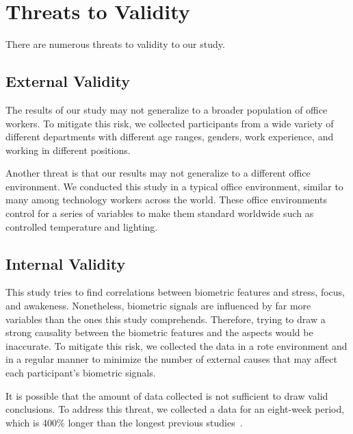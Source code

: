 \section{Threats to Validity}
There are numerous threats to validity to our study.

\subsection{External Validity}
The results of our study may 
 not generalize to a broader population of office workers.
To mitigate this risk, we collected participants
from a wide variety of different departments
with different age ranges, genders, work experience, and 
working in different positions.

Another threat is that our results may not generalize
to a different office environment. We conducted
this study in a typical office environment, similar to many
among technology workers across the world.
These office environments control for a series of
variables to make them standard worldwide such
as controlled temperature and lighting.

\subsection{Internal Validity}
This study tries to find correlations between
biometric features and  stress, focus, and awakeness.
Nonetheless, biometric signals are influenced by far more
variables than the ones this study comprehends.
Therefore, trying to draw a strong causality between the biometric
features and the aspects would be inaccurate.
To mitigate this risk,  we collected the data
in a rote environment and in a regular manner 
to minimize the number of 
external causes that may affect each participant's
biometric signals.

It is possible that the amount of data collected
is not sufficient
to draw valid conclusions. To address this threat, 
we collected a data for an eight-week period, which is
400\% longer than the longest previous studies~\cite{zuger18,Muller16}.



